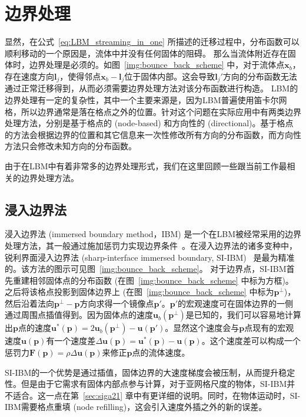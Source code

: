 \section{边界处理}
\label{sec:boundary_treatment}
显然，在公式~\ref{eq:LBM_streaming_in_one} 所描述的迁移过程中，分布函数可以顺利移动的一个原因是，流体中并没有任何固体的阻碍。
那么当流体附近存在固体时，边界处理是必须的。如图~\ref{img:bounce_back_scheme} 中，对于流体点$\bm{x}_b$，存在速度方向$\bm{l}_j$，使得邻点$\bm{x}_b-\bm{l}_j$位于固体内部。这会导致$\bm{l}_j'$方向的分布函数无法通过正常迁移得到，从而必须需要边界处理方法对该分布函数进行构造。
LBM的边界处理有一定的复杂性，其中一个主要来源是，因为LBM普遍使用笛卡尔网格，所以边界通常是落在格点之外的位置。针对这个问题在实际应用中有两类边界处理方法，分别是基于格点的 (node-based) 和方向性的 (directional)。基于格点的方法会根据边界的位置和其它信息来一次性修改所有方向的分布函数，而方向性方法只会修改未知方向的分布函数。

由于在LBM中有着非常多的边界处理形式，我们在这里回顾一些跟当前工作最相关的边界处理方法。

\subsection{浸入边界法}
浸入边界法 (immersed boundary method，IBM) 是一个在LBM被经常采用的边界处理方法，其一般通过施加惩罚力实现边界条件~\cite{patel2018diffuse,mittal-2008,Li-2020}。在浸入边界法的诸多变种中，锐利界面浸入边界法 (sharp-interface immersed boundary, SI-IBM)~\cite{mittal-2008} 是最为精准的。该方法的图示可见图~\ref{img:bounce_back_scheme}。
对于边界点，SI-IBM首先重建相邻固体点的分布函数 (在图~\ref{img:bounce_back_scheme} 中标为方框)。之后将该格点投影到固体边界上 (在图~\ref{img:bounce_back_scheme} 中标为$\bm{p}^\perp$)，然后沿着法向$\bm{p}^\perp\!-\!\bm{p}$方向求得一个镜像点$\bm{p}'$。$\bm{p}'$的宏观速度可在固体边界的一侧通过周围点插值得到。因为固体点的速度$\bm{u}_b(\bm{p}^\perp)$是已知的，我们可以容易地计算出$\bm{p}$点的速度$\bm{u}^*(\bm{p}) = 2\bm{u}_b(\bm{p}^\perp) - \bm{u}(\bm{p}')$。显然这个速度会与$\bm{p}$点现有的宏观速度$\bm{u}(\bm{p})$有一个速度差$\Delta\bm{u}(\bm{p}) = \bm{u}^*(\bm{p}) - \bm{u}(\bm{p})$。这个速度差可以构成一个惩罚力$\bm{F}(\bm{p}) = \rho\Delta\bm{u}(\bm{p})$来修正$\bm{p}$点的流体速度。

SI-IBM的一个优势是通过插值，固体边界的大速度梯度会被压制，从而提升稳定性。但是由于它需求有固体内部点参与计算，对于亚网格尺度的物体，SI-IBM并不适合。这一点在第~\ref{sec:siga21} 章中有更详细的说明。同时，在物体运动时，SI-IBM需要格点重填 (node refilling)，这会引入速度外插之外的新的误差。

